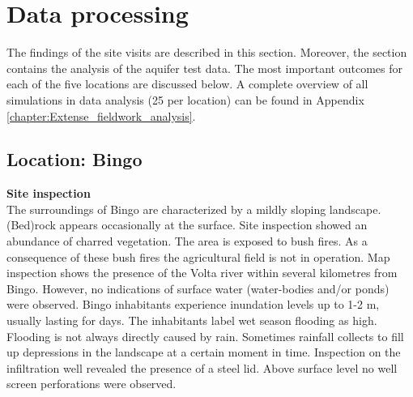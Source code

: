 

\section{Data processing}
\label{section:TS}
The findings of the site visits are described in this section. Moreover, the section contains the analysis of the aquifer test data. The most important outcomes for each of the five locations are discussed below. A complete overview of all simulations in data analysis (25 per location) can be found in Appendix \ref{chapter:Extense_fieldwork_analysis}.  

\subsection{Location: Bingo}

\textbf{Site inspection}\\
The surroundings of Bingo are characterized by a mildly sloping landscape. (Bed)rock appears occasionally at the surface. Site inspection showed an abundance of charred vegetation. The area is exposed to bush fires. As a consequence of these bush fires the agricultural field is not in operation. Map inspection shows the presence of the Volta river within several kilometres from Bingo. However, no indications of surface water (water-bodies and/or ponds) were observed. Bingo inhabitants experience inundation levels up to 1-2 m, usually lasting for days. The inhabitants label wet season flooding as high. Flooding is not always directly caused by rain. Sometimes rainfall collects to fill up depressions in the landscape at a certain moment in time. Inspection on the infiltration well revealed the presence of a steel lid. Above surface level no well screen perforations were observed. \\

